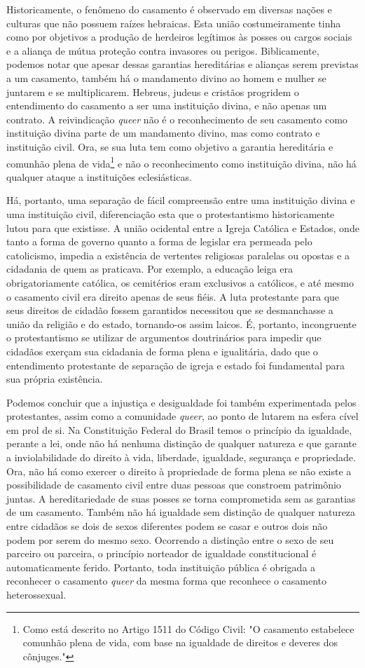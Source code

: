 \documentclass[
    article,            %
	12pt,				%
	oneside,			%
	a4paper,			%
	chapter=TITLE,		%
	section=TITLE,		%
	english,			%
	french,				%
	spanish,			%
	brazil				%
	]{abntex2}
\begin{document}
Historicamente, o fenômeno do casamento é observado em diversas nações e culturas que não possuem raízes hebraicas. Esta união costumeiramente tinha como por objetivos a produção de herdeiros legítimos às posses ou cargos sociais e a aliança de mútua proteção contra invasores ou perigos. Biblicamente, podemos notar que apesar dessas garantias hereditárias e alianças serem previstas a um casamento, também há o mandamento divino ao homem e mulher se juntarem e se multiplicarem. Hebreus, judeus e cristãos progridem o entendimento do casamento a ser uma instituição divina, e não apenas um contrato. A reivindicação \emph{queer} não é o reconhecimento de seu casamento como instituição divina parte de um mandamento divino, mas como contrato e instituição civil. Ora, se sua luta tem como objetivo a garantia hereditária e comunhão plena de vida\footnote{Como está descrito no Artigo 1511 do Código Civil: "O casamento estabelece comunhão plena de vida, com base na igualdade de direitos e deveres dos cônjuges."} e não o reconhecimento como instituição divina, não há qualquer ataque a instituições eclesiásticas.

Há, portanto, uma separação de fácil compreensão entre uma instituição divina e uma instituição civil, diferenciação esta que o protestantismo historicamente lutou para que existisse. A união ocidental entre a Igreja Católica e Estados, onde tanto a forma de governo quanto a forma de legislar era permeada pelo catolicismo, impedia a existência de vertentes religiosas paralelas ou opostas e a cidadania de quem as praticava. Por exemplo, a educação leiga era obrigatoriamente católica, os cemitérios eram exclusivos a católicos, e até mesmo o casamento civil era direito apenas de seus fiéis. A luta protestante para que seus direitos de cidadão fossem garantidos necessitou que se desmanchasse a união da religião e do estado, tornando-os assim laicos. É, portanto, incongruente o protestantismo se utilizar de argumentos doutrinários para impedir que cidadãos exerçam sua cidadania de forma plena e igualitária, dado que o entendimento protestante de separação de igreja e estado foi fundamental para sua própria existência.

Podemos concluir que a injustiça e desigualdade foi também experimentada pelos protestantes, assim como a comunidade \emph{queer}, ao ponto de lutarem na esfera cível em prol de si. Na Constituição Federal do Brasil temos o princípio da igualdade, perante a lei, onde não há nenhuma distinção de qualquer natureza e que garante a inviolabilidade do direito à vida, liberdade, igualdade, segurança e propriedade. Ora, não há como exercer o direito à propriedade de forma plena se não existe a possibilidade de casamento civil entre duas pessoas que constroem patrimônio juntas. A hereditariedade de suas posses se torna comprometida sem as garantias de um casamento. Também não há igualdade sem distinção de qualquer natureza entre cidadãos se dois de sexos diferentes podem se casar e outros dois não podem por serem do mesmo sexo. Ocorrendo a distinção entre o sexo de seu parceiro ou parceira, o princípio norteador de igualdade constitucional é automaticamente ferido. Portanto, toda instituição pública é obrigada a reconhecer o casamento \emph{queer} da mesma forma que reconhece o casamento heterossexual.
\end{document}
